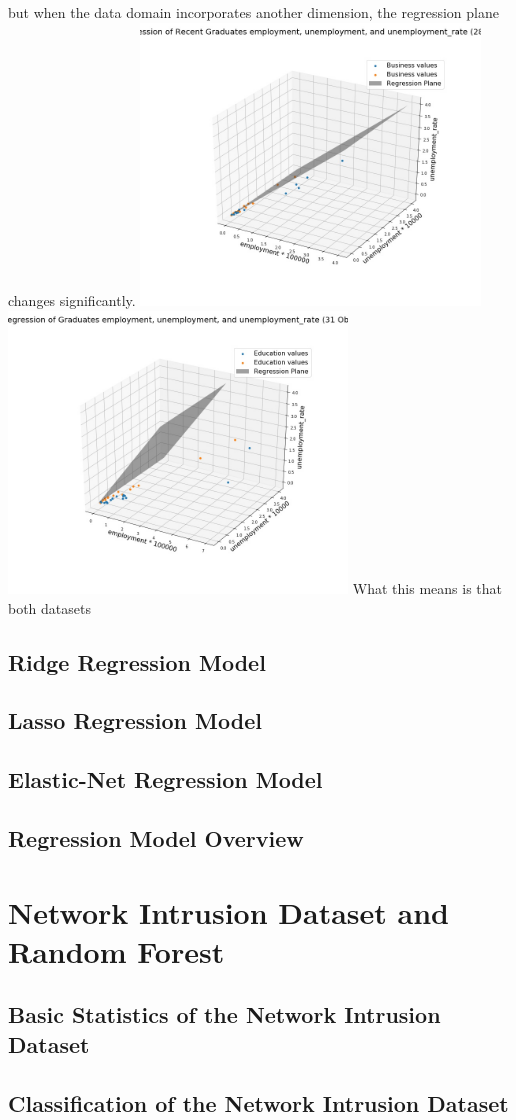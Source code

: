 \documentclass[a4paper,12pt]{IEEEtran}
\begin{document}
but when the data domain incorporates another dimension, the regression plane changes significantly.
\includegraphics[width=9cm]{std_reg_2d_recent_grad} \includegraphics[width=9cm]{std_reg_2d_grad}
What this means is that both datasets 

\subsection{Ridge Regression Model}
\label{sec2}

\subsection{Lasso Regression Model}
\label{sec3}

\subsection{Elastic-Net Regression Model}
\label{sec4}

\subsection{Regression Model Overview}
\label{sec5}

\section{Network Intrusion Dataset and Random Forest}

\subsection{Basic Statistics of the Network Intrusion Dataset}
\label{sec6}

\subsection{Classification of the Network Intrusion Dataset}
\label{sec7}
\end{document}
